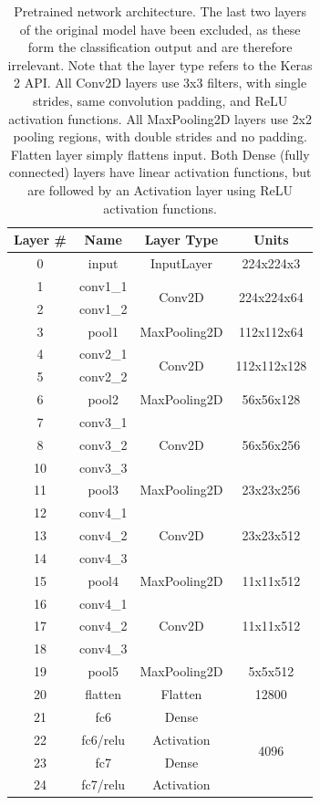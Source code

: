 \begin{table}[h!]
\begin{center}
\begin{tabular}{|c|c|c|c|}
\hline
\textbf{Layer \#} & \textbf{Name} & \textbf{Layer Type} & \textbf{Units} \\ \hline
0 & input & InputLayer & 224x224x3  \\ \hline
1 & conv1\_1 & \multirow{2}{*}{Conv2D} & \multirow{2}{*}{224x224x64} \\ \cline{1-2}
2 & conv1\_2 & & \\ \hline
3 & pool1 & MaxPooling2D & 112x112x64 \\ \hline
4 & conv2\_1 & \multirow{2}{*}{Conv2D} & \multirow{2}{*}{112x112x128} \\ \cline{1-2}
5 & conv2\_2 & & \\ \hline
6 & pool2 & MaxPooling2D & 56x56x128 \\ \hline
7 & conv3\_1 & \multirow{3}{*}{Conv2D} & \multirow{3}{*}{56x56x256} \\ \cline{1-2}
8 & conv3\_2 & & \\ \cline{1-2}
10 & conv3\_3 & & \\ \hline
11 & pool3 & MaxPooling2D & 23x23x256 \\ \hline
12 & conv4\_1 & \multirow{3}{*}{Conv2D} & \multirow{3}{*}{23x23x512} \\ \cline{1-2}
13 & conv4\_2 & & \\ \cline{1-2}
14 & conv4\_3 & & \\ \hline
15 & pool4 & MaxPooling2D & 11x11x512 \\ \hline
16 & conv4\_1 & \multirow{3}{*}{Conv2D} & \multirow{3}{*}{11x11x512} \\ \cline{1-2}
17 & conv4\_2 & & \\ \cline{1-2}
18 & conv4\_3 & & \\ \hline
19 & pool5 & MaxPooling2D & 5x5x512 \\ \hline
20 & flatten & Flatten & 12800 \\ \hline
21 & fc6 & Dense & \multirow{4}{*}{4096} \\ \cline{1-3}
22 & fc6/relu & Activation & \\ \cline{1-3}
23 & fc7 & Dense & \\ \cline{1-3}
24 & fc7/relu & Activation & \\ \hline
\end{tabular}
\end{center}
\caption[Pretrained network architecture]{Pretrained network architecture. The last two layers of the original model have been excluded, as these form the classification output and are therefore irrelevant. Note that the layer type refers to the Keras 2 API. All Conv2D layers use 3x3 filters, with single strides, same convolution padding, and ReLU activation functions. All MaxPooling2D layers use 2x2 pooling regions, with double strides and no padding. Flatten layer simply flattens input. Both Dense (fully connected) layers have linear activation functions, but are followed by an Activation layer using ReLU activation functions.}
\label{tab:vggface-arch}
\end{table}

